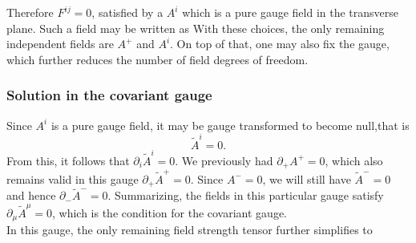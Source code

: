 Therefore $F^{ij}=0$, satisfied by a $A^i$ which is a {\sffamily\color{ming}pure gauge field} in the transverse plane. Such a field may be written as
With these choices, the only remaining independent fields are $A^+$ and $A^i$. On top of that, one may also fix the gauge, which further reduces the number of field degrees of freedom.


\subsubsection*{Solution in the covariant gauge} 
Since $A^i$ is a pure gauge field, it may be gauge transformed to become null,that is 
\begin{equation}\label{glasma18}
    \widetilde{A}^i=0.
\end{equation}
From this, it follows that $\partial_i\widetilde{A}^i=0$. We previously had $\partial_+A^+=0$, which also remains valid in this gauge $\partial_+\widetilde{A}^+=0$. Since $A^-=0$, we will still have $\widetilde{A}^-=0$ and hence $\partial_-\widetilde{A}^-=0$. Summarizing, the fields in this particular gauge satisfy $\partial_\mu\widetilde{A}^\mu=0$, which is the condition for the {\color{ming}\sffamily covariant gauge}. \\
In this gauge, the only remaining field strength tensor further simplifies to
